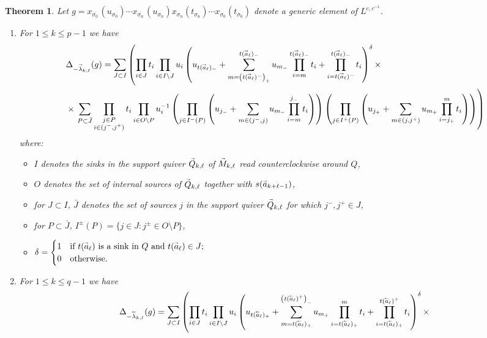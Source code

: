 \documentclass[12pt]{amsart}
\renewcommand{\vec}[1]{\accentset{\shortrightarrow}{#1}}
\newcommand{\cev}[1]{\accentset{\shortleftarrow}{#1}}
\newtheorem{theorem}{Theorem}[section]
\numberwithin{equation}{section}
\begin{document}
  {%
  \begin{theorem}
    Let $g=x_{\overline{\sigma_0\!}\,}(u_{\sigma_0})\cdots x_{\overline{\sigma_n\!}\,}(u_{\sigma_n}) x_{\sigma_n}(t_{\sigma_n}) \cdots x_{\sigma_0}(t_{\sigma_0})$ denote a generic element of $L^{c,c^{-1}}$.
    \begin{enumerate}
      \item For $1\le k\le p-1$ we have
      \begin{align}
        &\Delta_{-\vec{\lambda}_{k,\ell}}(g)=\sum_{J\subset I}\left(\prod_{i\in J} t_i\prod_{i\in I\setminus J} u_i\left(u_{t(\vec{a}_\ell)_-}+\sum_{m=\left(t(\vec{a}_\ell)^-\right)_+}^{t(\vec{a}_\ell)_-}u_{m_-}\prod_{i=m}^{t(\vec{a}_\ell)_-} t_i+\prod_{i=t(\vec{a}_\ell)^-}^{t(\vec{a}_\ell)_-}t_i\right)^\delta\times\right.\\
        \nonumber&\times\left.\sum_{P\subset\bar{J}}\prod_{\substack{j\in P\\i\in(j^-,j^+)}}t_i\prod_{i\in O\setminus P}u_i^{-1}\left(\prod_{j\in I^-(P)}\left(u_{j_-}+\sum_{m\in(j^-,j)}u_{m_-}\prod_{i=m}^{j_-} t_i\right)\right)\left(\prod_{j\in I^+(P)}\left(u_{j_+}+\sum_{m\in(j,j^+)}u_{m_+}\prod_{i=j_+}^m t_i\right)\right)\right)
      \end{align}
      where:
      \begin{itemize}
        \item $I$ denotes the sinks in the support quiver $\vec{Q}_{k,\ell}$ of $\vec{M}_{k,\ell}$ read counterclockwise around $Q$,
        \item $O$ denotes the set of internal sources of $\vec{Q}_{k,\ell}$ together with $s(\vec{a}_{k+\ell-1})$,
        \item for $J\subset I$, $\bar{J}$ denotes the set of sources $j$ in the support quiver $\vec{Q}_{k,\ell}$ for which $j^-,j^+\in J$,
        \item for $P\subset\bar{J}$, $I^\pm(P)=\{j\in J:j^\pm\in O\setminus P\}$,
        \item $\delta=\begin{cases}1 & \text{if $t(\vec{a}_\ell)$ is a sink in $Q$ and $t(\vec{a}_\ell)\in J$;}\\0 & \text{otherwise.}\end{cases}$
      \end{itemize}
      \item For $1\le k\le q-1$ we have
      \begin{align}
        &\Delta_{-\cev{\lambda}_{k,\ell}}(g)=\sum_{J\subset I}\left(\prod_{i\in J} t_i\prod_{i\in I\setminus J} u_i\left(u_{t(\cev{a}_\ell)_+}+\sum_{m=t(\cev{a}_\ell)_+}^{\left(t(\cev{a}_\ell)^+\right)_-}u_{m_+}\prod_{i=t(\cev{a}_\ell)_+}^m t_i+\prod_{i=t(\cev{a}_\ell)_+}^{t(\cev{a}_\ell)^+}t_i\right)^\delta\times\right.\\

\end{align}
\end{enumerate}
\end{theorem}}
\end{document}

